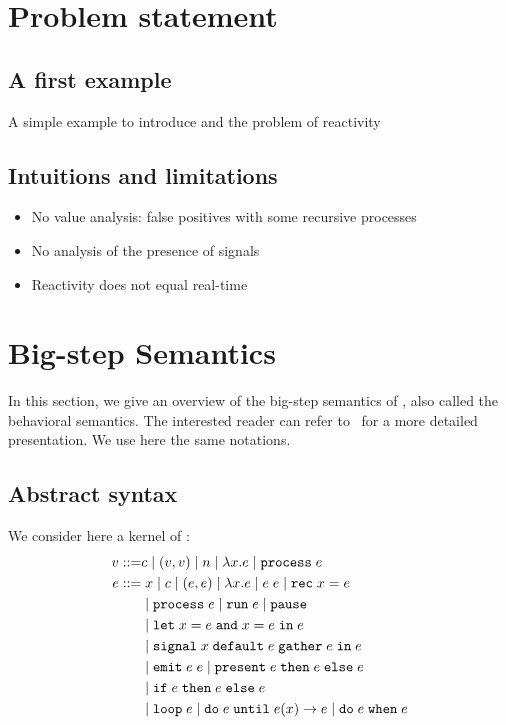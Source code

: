 \documentclass[9pt,preprint]{sigplanconf}
\newcommand{\sdeq}{::=}
\begin{document}
\section{Problem statement}

\subsection{A first example}

A simple example to introduce \rml{} and the problem of reactivity

\subsection{Intuitions and limitations}
\label{sec:intuition}

\begin{itemize}
\item No value analysis: false positives with some recursive processes
\item No analysis of the presence of signals
\item Reactivity does not equal real-time
\end{itemize}

\section{Big-step Semantics}

In this section, we give an overview of the big-step semantics of \rml{}, also called the behavioral semantics. The interested reader can refer to~\cite{Mandel:2005} for a more detailed presentation. We use here the same notations.

\subsection{Abstract syntax}

We consider here a kernel of \rml{}:
%
\begin{align*}
v \sdeq & c \mid (v, v) \mid n \mid \elam{x}{e} \mid \eproc{e} \\
e \sdeq &\phantom{\mid}  x \mid c \mid (e, e) \mid \elam{x}{e} 
  \mid \eapp{e}{e} \mid \erec{x}{e} \\
  & \mid \eproc{e} \mid \erun{e} \mid \epause{}  \\
& \mid \eletpar{x}{e}{x}{e}{e} \\
 &\mid \esig{x}{e}{e}{e} \\
 & \mid \eemit{e}{e} \mid \epres{e}{e}{e} \\
 & \mid \eite{e}{e}{e} \\
 &  \mid \eloop{e} \mid \euntil{e}{e}{x}{e} 
   \mid \ewhen{e}{e} 
\end{align*}
\end{document}
